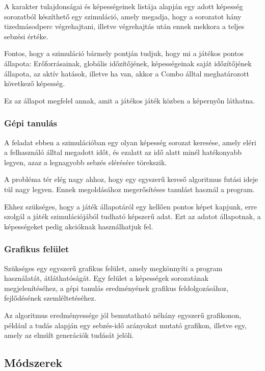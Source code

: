 \documentclass[12pt]{article}
\begin{document}
	A karakter tulajdonságai és képességeinek listája alapján egy adott képesség sorozatból készíthető egy szimuláció, amely megadja, hogy a sorozatot hány tizedmásodperc végrehajtani, illetve végrehajtás után ennek mekkora a teljes sebzési értéke.
	
	Fontos, hogy a szimuláció bármely pontján tudjuk, hogy mi a játékos pontos állapota: Erőforrásainak, globális időzítőjének, képességeinak saját időzítőjének állapota, az aktív hatások, illetve ha van, akkor a Combo álltal meghatározott következő képesség.
	
	Ez az állapot megfelel annak, amit a játékos játék közben a képernyőn láthatna.
	
	\subsubsection{Gépi tanulás}
	
	A feladat ebben a szimulációban egy olyan képesség sorozat keresése, amely eléri a felhasználó álltal megadott időt, és ezalatt az idő alatt minél hatékonyabb legyen, azaz a legnagyobb sebzés elérésére törekszik.
	
	A probléma tér elég nagy ahhoz, hogy egy egyszerű kereső algoritmus futási ideje túl nagy legyen. Ennek megoldásához megerősítéses tanulást használ a program.
	
	Ehhez szükséges, hogy a játék állapotáról egy kellően pontos képet kapjunk, erre szolgál a játék szimulációjából tudható képszerű adat. Ezt az adatot állapotnak, a képességeket pedig akcióknak használhatjuk fel.
	
	\subsubsection{Grafikus felület}
	
	Szükséges egy egyszerű grafikus felület, amely megkönnyíti a program használatát, átláthatóságát. Egy felület a képességek sorozatának megjelenítéséhez, a gépi tanulás eredményének grafikus feldolgozásához, fejlődésének szemléltetéséhez.
	
	Az algoritmus eredményessége jól bemutatható néhány egyszerű grafikonon, például a tudás alapján egy sebzés-idő arányokat mutató grafikon, illetve egy, amely az elmúlt generációk tudását jelöli.
	
	\subsection{Módszerek}
	
\end{document}

